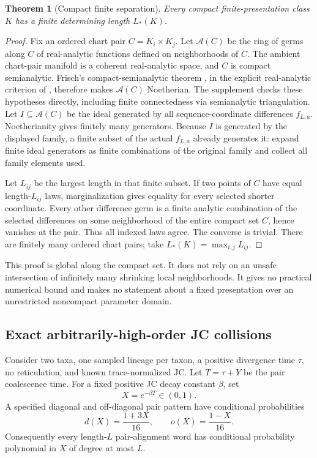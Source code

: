 \documentclass[11pt]{article}
\newtheorem{theorem}{Theorem}[section]
\newcommand{\cA}{\mathcal A}
\begin{document}
\begin{theorem}[Compact finite separation]
\label{thm:compact-finite}
Every compact finite-presentation class $K$ has a finite determining length $L_*(K)$.
\end{theorem}

\begin{proof}
Fix an ordered chart pair $C=K_i\times K_j$.  Let $\cA(C)$ be the ring of germs along $C$ of real-analytic functions defined on neighborhoods of $C$.  The ambient chart-pair manifold is a coherent real-analytic space, and $C$ is compact semianalytic.  Frisch's compact-semianalytic theorem \citep[Theorem~I.9]{Frisch1967}, in the explicit real-analytic criterion of \citet[Theorem~2 and the final Remark concerning statement~(1)]{Siu1969}, therefore makes $\cA(C)$ Noetherian.  The supplement checks these hypotheses directly, including finite connectedness via semianalytic triangulation.  Let $I\subseteq\cA(C)$ be the ideal generated by all sequence-coordinate differences $f_{L,a}$.  Noetherianity gives finitely many generators.  Because $I$ is generated by the displayed family, a finite subset of the actual $f_{L,a}$ already generates it: expand finite ideal generators as finite combinations of the original family and collect all family elements used.

Let $L_{ij}$ be the largest length in that finite subset.  If two points of $C$ have equal length-$L_{ij}$ laws, marginalization gives equality for every selected shorter coordinate.  Every other difference germ is a finite analytic combination of the selected differences on some neighborhood of the entire compact set $C$, hence vanishes at the pair.  Thus all indexed laws agree.  The converse is trivial.  There are finitely many ordered chart pairs; take $L_*(K)=\max_{i,j}L_{ij}$.
\end{proof}

This proof is global along the compact set.  It does not rely on an unsafe intersection of infinitely many shrinking local neighborhoods.  It gives no practical numerical bound and makes no statement about a fixed presentation over an unrestricted noncompact parameter domain.

\subsection{Exact arbitrarily-high-order JC collisions}

Consider two taxa, one sampled lineage per taxon, a positive divergence time $\tau$, no reticulation, and known trace-normalized JC.  Let $T=\tau+Y$ be the pair coalescence time.  For a fixed positive JC decay constant $\beta$, set
\[
X=e^{-\beta T}\in(0,1).
\]
A specified diagonal and off-diagonal pair pattern have conditional probabilities
\begin{equation}
d(X)=\frac{1+3X}{16},\qquad o(X)=\frac{1-X}{16}.
\label{eq:jc-affine}
\end{equation}
Consequently every length-$L$ pair-alignment word has conditional probability polynomial in $X$ of degree at most $L$.
\end{document}
